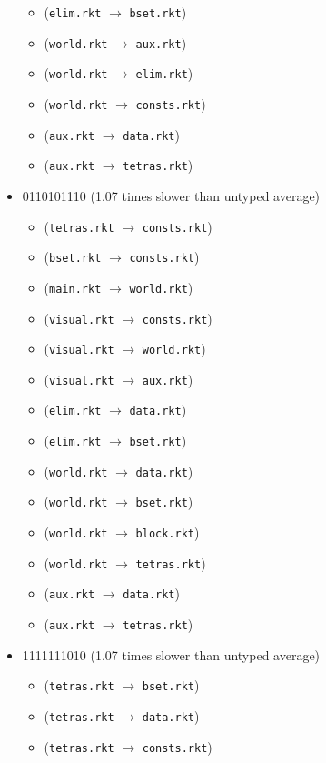 \documentclass{article}
\newcommand{\mono}[1]{\texttt{#1}}
\begin{document}
\begin{itemize}
\begin{itemize}
  \item (\mono{elim.rkt} $\rightarrow$ \mono{bset.rkt})
  \item (\mono{world.rkt} $\rightarrow$ \mono{aux.rkt})
  \item (\mono{world.rkt} $\rightarrow$ \mono{elim.rkt})
  \item (\mono{world.rkt} $\rightarrow$ \mono{consts.rkt})
  \item (\mono{aux.rkt} $\rightarrow$ \mono{data.rkt})
  \item (\mono{aux.rkt} $\rightarrow$ \mono{tetras.rkt})
  \end{itemize}
\item 0110101110 (1.07 times slower than untyped average)
  \begin{itemize}
  \item (\mono{tetras.rkt} $\rightarrow$ \mono{consts.rkt})
  \item (\mono{bset.rkt} $\rightarrow$ \mono{consts.rkt})
  \item (\mono{main.rkt} $\rightarrow$ \mono{world.rkt})
  \item (\mono{visual.rkt} $\rightarrow$ \mono{consts.rkt})
  \item (\mono{visual.rkt} $\rightarrow$ \mono{world.rkt})
  \item (\mono{visual.rkt} $\rightarrow$ \mono{aux.rkt})
  \item (\mono{elim.rkt} $\rightarrow$ \mono{data.rkt})
  \item (\mono{elim.rkt} $\rightarrow$ \mono{bset.rkt})
  \item (\mono{world.rkt} $\rightarrow$ \mono{data.rkt})
  \item (\mono{world.rkt} $\rightarrow$ \mono{bset.rkt})
  \item (\mono{world.rkt} $\rightarrow$ \mono{block.rkt})
  \item (\mono{world.rkt} $\rightarrow$ \mono{tetras.rkt})
  \item (\mono{aux.rkt} $\rightarrow$ \mono{data.rkt})
  \item (\mono{aux.rkt} $\rightarrow$ \mono{tetras.rkt})
  \end{itemize}
\item 1111111010 (1.07 times slower than untyped average)
  \begin{itemize}
  \item (\mono{tetras.rkt} $\rightarrow$ \mono{bset.rkt})
  \item (\mono{tetras.rkt} $\rightarrow$ \mono{data.rkt})
  \item (\mono{tetras.rkt} $\rightarrow$ \mono{consts.rkt})

\end{itemize}
\end{itemize}
\end{document}
